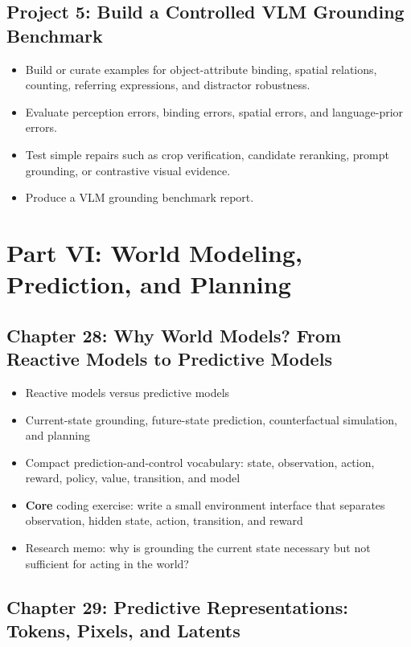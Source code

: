 \documentclass[11pt]{article}
\begin{document}
\subsection{Project 5: Build a Controlled VLM Grounding Benchmark}

\begin{itemize}
    \item Build or curate examples for object-attribute binding, spatial relations, counting, referring expressions, and distractor robustness.
    \item Evaluate perception errors, binding errors, spatial errors, and language-prior errors.
    \item Test simple repairs such as crop verification, candidate reranking, prompt grounding, or contrastive visual evidence.
    \item Produce a VLM grounding benchmark report.
\end{itemize}

\section{Part VI: World Modeling, Prediction, and Planning}

\subsection{Chapter 28: Why World Models? From Reactive Models to Predictive Models}

\begin{itemize}
    \item Reactive models versus predictive models
    \item Current-state grounding, future-state prediction, counterfactual simulation, and planning
    \item Compact prediction-and-control vocabulary: state, observation, action, reward, policy, value, transition, and model
    \item \textbf{Core} coding exercise: write a small environment interface that separates observation, hidden state, action, transition, and reward
    \item Research memo: why is grounding the current state necessary but not sufficient for acting in the world?
\end{itemize}

\subsection{Chapter 29: Predictive Representations: Tokens, Pixels, and Latents}
\end{document}
